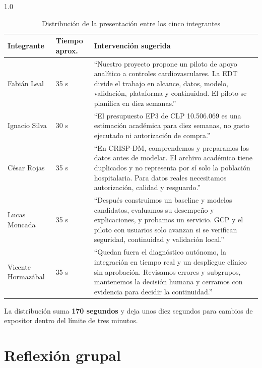 \documentclass[12pt,a4paper]{article}
\begin{document}
\begin{spacing}{1.0}
\begin{table}[H]
  \centering
  \caption{Distribución de la presentación entre los cinco integrantes}
  \small
  \begin{tabularx}{\textwidth}{@{}p{2.6cm}p{1.6cm}X@{}}
    \toprule
    Integrante & Tiempo aprox. & Intervención sugerida \\
    \midrule
    Fabián Leal & 35 s & ``Nuestro proyecto propone un piloto de apoyo analítico a controles cardiovasculares. La EDT divide el trabajo en alcance, datos, modelo, validación, plataforma y continuidad. El piloto se planifica en diez semanas.'' \\
    Ignacio Silva & 30 s & ``El presupuesto EP3 de CLP 10.506.069 es una estimación académica para diez semanas, no gasto ejecutado ni autorización de compra.'' \\
    César Rojas & 35 s & ``En CRISP-DM, comprendemos y preparamos los datos antes de modelar. El archivo académico tiene duplicados y no representa por sí solo la población hospitalaria. Para datos reales necesitamos autorización, calidad y resguardo.'' \\
    Lucas Moncada & 35 s & ``Después construimos un baseline y modelos candidatos, evaluamos su desempeño y explicaciones, y probamos un servicio. GCP y el piloto con usuarios solo avanzan si se verifican seguridad, continuidad y validación local.'' \\
    Vicente Hormazábal & 35 s & ``Quedan fuera el diagnóstico autónomo, la integración en tiempo real y un despliegue clínico sin aprobación. Revisamos errores y subgrupos, mantenemos la decisión humana y cerramos con evidencia para decidir la continuidad.'' \\
    \bottomrule
  \end{tabularx}
\end{table}
\end{spacing}

La distribución suma \textbf{170 segundos} y deja unos diez segundos para cambios de expositor dentro del límite de tres minutos.

\section{Reflexión grupal}
\end{document}
